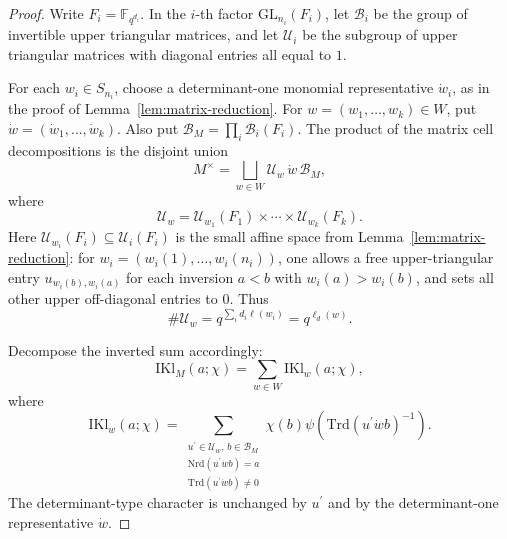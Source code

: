 \documentclass[10pt,a4paper]{amsart}
\newcommand{\IKl}{\mathrm{IKl}}
\newcommand{\Nrd}{\mathrm{Nrd}}
\newcommand{\Trd}{\mathrm{Trd}}
\renewcommand{\subset}{\subseteq}
\begin{document}
\begin{proof}
Write \(F_i=\mathbb{F}_{q^{d_i}}\).  In the \(i\)-th factor
\(\mathrm{GL}_{n_i}(F_i)\), let \(\mathcal{B}_i\) be the group of
invertible upper triangular matrices, and let \(\mathcal{U}_i\) be the
subgroup of upper triangular matrices with diagonal entries all equal
to \(1\).

For each \(w_i\in S_{n_i}\), choose a determinant-one monomial
representative \(\dot w_i\), as in the proof of
Lemma~\ref{lem:matrix-reduction}.  For
\(w=(w_1,\ldots,w_k)\in W\), put
\(\dot w=(\dot w_1,\ldots,\dot w_k)\).  Also put
\(\mathcal{B}_M=\prod_i\mathcal{B}_i(F_i)\).  The product of the
matrix cell decompositions is the disjoint union
\[
M^\times
=
\bigsqcup_{w\in W}
\mathcal{U}_w\, \dot w\, \mathcal{B}_M,
\]
where
\[
\mathcal{U}_w=
\mathcal{U}_{w_1}(F_1)\times\cdots\times
\mathcal{U}_{w_k}(F_k).
\]
Here \(\mathcal{U}_{w_i}(F_i)\subset \mathcal{U}_i(F_i)\) is the
small affine space from Lemma~\ref{lem:matrix-reduction}: for
\(w_i=(w_i(1),\ldots,w_i(n_i))\), one allows a free upper-triangular
entry \(u_{w_i(b),w_i(a)}\) for each inversion \(a<b\) with
\(w_i(a)>w_i(b)\), and sets all other upper off-diagonal entries to
\(0\).  Thus
\[
\#\mathcal{U}_w=q^{\sum_i d_i\ell(w_i)}=q^{\ell_d(w)}.
\]

Decompose the inverted sum accordingly:
\begin{equation}\label{eq:ikl-cell-decomp}
\IKl_M(a;\chi)=\sum_{w\in W}\IKl_w(a;\chi),
\end{equation}
where
\[
\IKl_w(a;\chi)
=
\sum_{\substack{u^{\prime}\in \mathcal{U}_w,\, b\in \mathcal{B}_M\\
    \Nrd(u^{\prime}\dot w b)=a\\ \Trd(u^{\prime}\dot w b)\neq 0}}
\chi(b)\psi(\Trd(u^{\prime}\dot w b)^{-1}).
\]
The determinant-type character is unchanged by \(u^{\prime}\) and by the
determinant-one representative \(\dot w\).


\end{proof}
\end{document}
